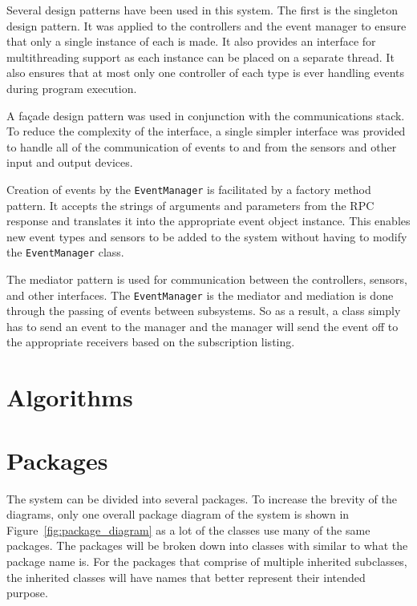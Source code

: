 \documentclass{report}
\begin{document}

Several design patterns have been used in this system. The first is the
singleton design pattern. It was applied to the controllers and the event
manager to ensure that only a single instance of each is made. It also provides
an interface for multithreading support as each instance can be placed on a
separate thread. It also ensures that at most only one controller of each type
is ever handling events during program execution.

A fa\c{c}ade design pattern was used in conjunction with the communications
stack. To reduce the complexity of the interface, a single simpler interface
was provided to handle all of the communication of events to and from the
sensors and other input and output devices.

Creation of events by the \texttt{EventManager} is facilitated by a factory
method pattern. It accepts the strings of arguments and parameters from the RPC
response and translates it into the appropriate event object instance. This
enables new event types and sensors to be added to the system without having to
modify the \texttt{EventManager} class.

The mediator pattern is used for communication between the controllers,
sensors, and other interfaces. The \texttt{EventManager} is the mediator and
mediation is done through the passing of events between subsystems. So as a
result, a class simply has to send an event to the manager and the manager will
send the event off to the appropriate receivers based on the subscription
listing.

\section{Algorithms}

\section{Packages}
The system can be divided into several packages. To increase the brevity of the
diagrams, only one overall package diagram of the system is shown in
Figure~\ref{fig:package_diagram} as a lot of the classes use many of the same
packages. The packages will be broken down into classes with similar to what
the package name is. For the packages that comprise of multiple inherited
subclasses, the inherited classes will have names that better represent their
intended purpose.
\end{document}
